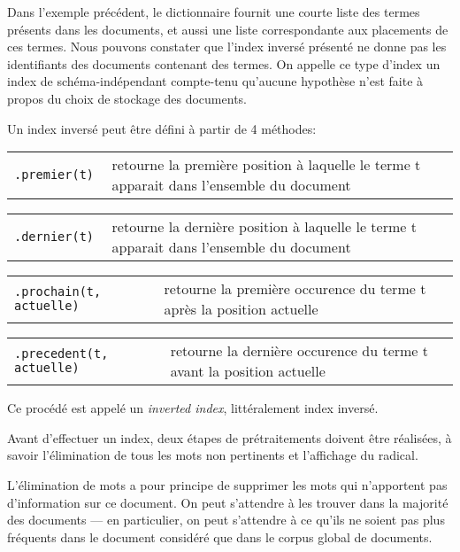 Dans l'exemple précédent, le dictionnaire fournit une courte
liste des termes présents dans les documents, et aussi une
liste correspondante aux placements de ces termes. Nous pouvons
constater que l'index inversé présenté ne donne pas les
identifiants des documents contenant des termes.
On appelle ce type d'index un index de
schéma-indépendant compte-tenu qu'aucune hypothèse
n'est faite à propos du choix de stockage des documents.

Un index inversé peut être défini à partir de 4 méthodes:

\begin{addmargin}{.5cm}

\begin{tabular}{l p{11cm}}
\tt .premier(t) & retourne la première position à
                  laquelle le terme t apparait dans
                  l'ensemble du document
\end{tabular}

\begin{tabular}{l p{11cm}}
\tt .dernier(t) & retourne la dernière position à
                  laquelle le terme t apparait dans
                  l'ensemble du document
\end{tabular}

\begin{tabular}{l p{8.2cm}}
\tt .prochain(t, actuelle) & retourne la première
                             occurence du terme t après la
                             position actuelle
\end{tabular}

\begin{tabular}{l p{8.1cm}}
\tt .precedent(t, actuelle) & retourne la dernière
                             occurence du terme t avant la
                             position actuelle
\end{tabular}

\end{addmargin}

Ce procédé est appelé un {\it inverted index},
littéralement index inversé.

Avant d'effectuer un index, deux étapes de prétraitements
doivent être réalisées, à savoir l'élimination de tous
les mots non pertinents et l'affichage du radical.

L'élimination de mots a pour principe de supprimer les mots
qui n'apportent pas d'information sur ce document.
On peut s'attendre à les trouver dans la majorité des documents
\---- en particulier, on peut s'attendre à ce qu'ils ne soient
pas plus fréquents dans le document considéré que dans le corpus
global de documents.

